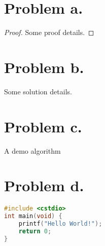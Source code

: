 \section{Problem a.}
\begin{proof}
    Some proof details.
\end{proof}

\section{Problem b.}
\begin{solution}
    Some solution details.
\end{solution}

\section{Problem c.}
\begin{algorithm}[!htbp]
    \caption{A demo algorithm}
\end{algorithm}

\section{Problem d.}
\begin{lstlisting}[language=c++]
#include <cstdio>
int main(void) {
    printf("Hello World!");
    return 0;
}
\end{lstlisting}

